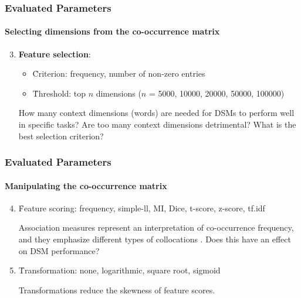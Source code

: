 \documentclass[t]{beamer} %
\begin{document}
\begin{frame}
  \frametitle{Evaluated Parameters}
  \framesubtitle{Selecting dimensions from the co-occurrence matrix} 
  \begin{enumerate}
    \setcounter{enumi}{2} 
  \item \textbf{Feature selection}: 
    \begin{itemize}
    \item   \h{Criterion}: frequency, number of non-zero entries 
    \item   \h{Threshold}: top $n$ dimensions ($n$ = 5000, 10000, 20000, 50000, 100000)
    \end{itemize}          
    \begin{block}{}\small
      How many context dimensions (words) are needed for DSMs to perform well in specific tasks? Are too many context dimensions detrimental? What is the best selection criterion? 
    \end{block}   
    
  \end{enumerate}   

\end{frame}


\begin{frame}
  \frametitle{Evaluated Parameters}
  \framesubtitle{Manipulating the co-occurrence matrix} 
  
  \begin{enumerate}
    \setcounter{enumi}{3}
    
  \item   \h{Feature scoring}: frequency, simple-ll, MI, Dice, t-score, z-score, tf.idf
    \begin{block}{}\small
      Association measures represent an interpretation of co-occurrence frequency, and they emphasize different types of collocations \citep{Evert:08}. Does this have an effect on DSM performance? 
    \end{block}
    
  \item  \h{Transformation}: none, logarithmic, square root, sigmoid
    \begin{block}{}\small
      Transformations reduce the skewness of feature scores.
    \end{block}
    
  \end{enumerate}   

\end{frame}
\end{document}
